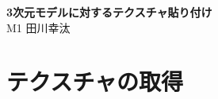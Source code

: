 \documentclass[]{jarticle}          %
\begin{document}

\vspace*{2ex}
\begin{center}
 {\Large \bf 3次元モデルに対するテクスチャ貼り付け}\\ %
 \vspace*{5mm}
 {\large M1 田川幸汰}%
\end{center}





\section{テクスチャの取得}
\end{document}
